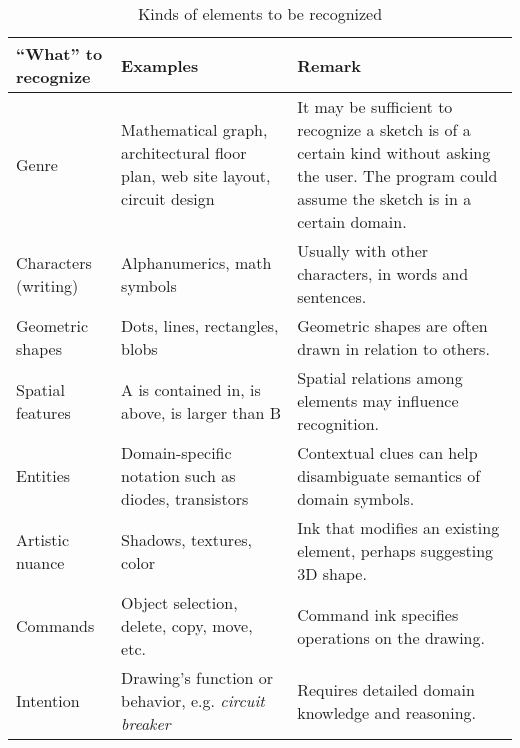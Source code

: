 \begin{landscape}
\begin{table}
\begin{tabular}{ p{4cm} | p{4.5cm} | p{5.5cm} }
\textbf{``What'' to recognize} & 
\textbf{Examples} & 
\textbf{Remark} \\ 
\hline \hline

Genre &
Mathematical graph, architectural floor plan, web site layout, circuit design &

It may be sufficient to recognize a sketch is of a certain kind
without asking the user. The program could assume the sketch is
in a certain domain.\\ \hline

Characters (writing) & 
Alphanumerics, math symbols & 
Usually with other characters, in words and sentences. \\ \hline

Geometric shapes & 
Dots, lines, rectangles, blobs &
Geometric shapes are often drawn in relation to others. \\ \hline

Spatial features &
A is contained in, is above, is larger than B &
Spatial relations among elements may influence recognition. \\ \hline

Entities &
Domain-specific notation such as diodes, transistors &
Contextual clues can help disambiguate semantics of domain symbols. \\ \hline

Artistic nuance &
Shadows, textures, color &
Ink that modifies an existing element, perhaps suggesting 3D shape. \\ \hline

Commands &
Object selection, delete, copy, move, etc. &
Command ink specifies operations on the drawing. \\ \hline

Intention &
Drawing's function or behavior, e.g. \textit{circuit breaker} & 
Requires detailed domain knowledge and reasoning. \\ \hline

\end{tabular}
\caption[Elements to Recognize]{Kinds of elements to be recognized}
\label{tab:what}
\end{table}
\end{landscape}
